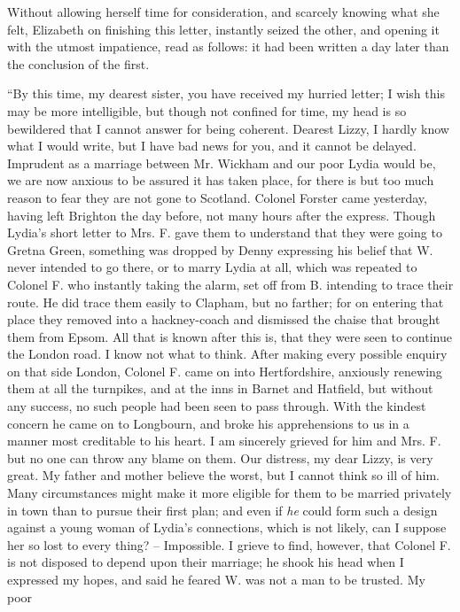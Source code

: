 Without allowing herself time for consideration, and
scar\-cely knowing what she felt, Elizabeth on finishing this
letter, instantly seized the other, and opening it with the
utmost impatience, read as follows: it had been written
a day later than the conclusion of the first.

“By this time, my dearest sister, you have received
my hurried letter; I wish this may be more intelligible,
but though not confined for time, my head is so bewildered
that I cannot answer for being coherent. Dearest Lizzy,
I hardly know what I would write, but I have bad news
for you, and it cannot be delayed. Imprudent as a marriage
between Mr. Wickham and our poor Lydia would be, we
are now anxious to be assured it has taken place, for
there is but too much reason to fear they are not gone to
Scotland. Colonel Forster came yesterday, having left
Brighton the day before, not many hours after the express.
Though Lydia’s short letter to Mrs. F. gave them to understand
that they were going to Gretna Green, something
was dropped by Denny expressing his belief that W. never
intended to go there, or to marry Lydia at all, which was
repeated to Colonel F. who instantly taking the alarm,
set off from B. intending to trace their route. He did
trace them easily to Clapham, but no farther; for on
entering that place they removed into a hackney-coach
and dismissed the chaise that brought them from Epsom.
All that is known after this is, that they were seen to
continue the London road. I know not what to think.
After making every possible enquiry on that side London,
Colonel F. came on into Hertfordshire, anxiously renewing
them at all the turnpikes, and at the inns in Barnet and
Hatfield, but without any success, no such people had
been seen to pass through. With the kindest concern he
came on to Longbourn, and broke his apprehensions to us
in a manner most creditable to his heart. I am sincerely
grieved for him and Mrs. F. but no one can throw any
blame on them. Our distress, my dear Lizzy, is very great.
My father and mother believe the worst, but I cannot
think so ill of him. Many circumstances might make it
more eligible for them to be married privately in town than
to pursue their first plan; and even if \textit{he} could form such
a design against a young woman of Lydia’s connections,
which is not likely, can I suppose her so lost to every
thing? -- Impossible. I grieve to find, however, that
Colonel F. is not disposed to depend upon their marriage;
he shook his head when I expressed my hopes, and said
he feared W. was not a man to be trusted. My poor
